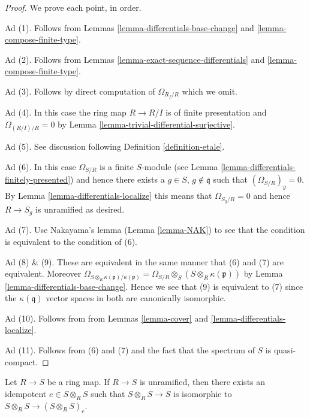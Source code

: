 \begin{proof}
We prove each point, in order.

\medskip\noindent
Ad (1). Follows from Lemmas \ref{lemma-differentials-base-change}
and \ref{lemma-compose-finite-type}.

\medskip\noindent
Ad (2). Follows from Lemmas \ref{lemma-exact-sequence-differentials}
and \ref{lemma-compose-finite-type}.

\medskip\noindent
Ad (3). Follows by direct computation of $\Omega_{R_f/R}$ which we omit.

\medskip\noindent
Ad (4). In this case the ring map $R \to R/I$ is of finite presentation
and $\Omega_{(R/I)/R} = 0$ by
Lemma \ref{lemma-trivial-differential-surjective}.

\medskip\noindent
Ad (5). See discussion following Definition \ref{definition-etale}.

\medskip\noindent
Ad (6). In this case $\Omega_{S/R}$ is a finite $S$-module (see
Lemma \ref{lemma-differentials-finitely-presented}) and hence there
exists a $g \in S$, $g \not \in \mathfrak q$ such that
$(\Omega_{S/R})_g = 0$. By Lemma \ref{lemma-differentials-localize}
this means that $\Omega_{S_g/R} = 0$ and hence $R \to S_g$ is
unramified as desired.

\medskip\noindent
Ad (7). Use Nakayama's lemma (Lemma \ref{lemma-NAK}) to see that
the condition is equivalent to the condition of (6).

\medskip\noindent
Ad (8) \& (9). These are equivalent in the same manner that (6) and (7)
are equivalent. Moreover
$\Omega_{S \otimes_R \kappa(\mathfrak p)/\kappa(\mathfrak p)} =
\Omega_{S/R} \otimes_S (S \otimes_R \kappa(\mathfrak p))$ by
Lemma \ref{lemma-differentials-base-change}.
Hence we see that (9) is equivalent to (7) since
the $\kappa(\mathfrak q)$ vector spaces in both are canonically
isomorphic.

\medskip\noindent
Ad (10). Follows from from Lemmas \ref{lemma-cover}
and \ref{lemma-differentials-localize}.

\medskip\noindent
Ad (11). Follows from (6) and (7) and the fact that the spectrum of $S$
is quasi-compact.
\end{proof}

\begin{lemma}
\label{lemma-diagonal-unramified}
Let $R \to S$ be a ring map.
If $R \to S$ is unramified, then there exists an idempotent
$e \in S \otimes_R S$ such that $S \otimes_R S \to S$ is isomorphic
to $S \otimes_R S \to (S \otimes_R S)_e$.
\end{lemma}

